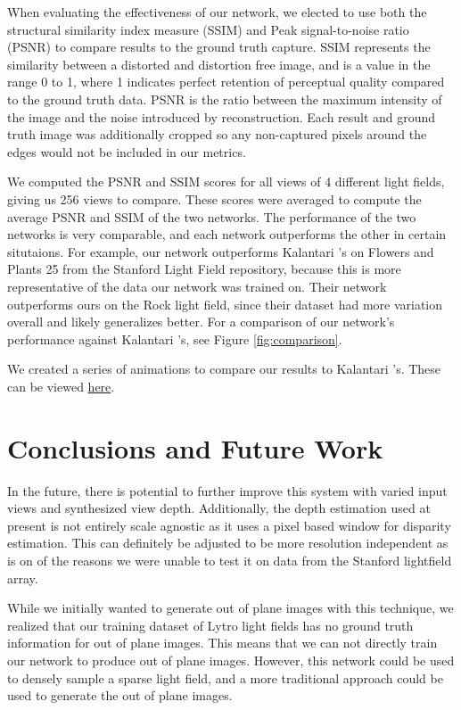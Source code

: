 \documentclass[10pt,twocolumn,letterpaper]{article}
\begin{document}
When evaluating the effectiveness of our network, we elected to use both the structural similarity index measure (SSIM)
and Peak signal-to-noise ratio (PSNR) to compare results to the ground truth capture. SSIM represents the similarity
between a distorted and distortion free image, and is a value in the range 0 to 1, where 1 indicates perfect retention
of perceptual quality compared to the ground truth data. PSNR is the ratio between the maximum intensity of the image
and the noise introduced by reconstruction. Each result and ground truth image was additionally cropped so any
non-captured pixels around the edges would not be included in our metrics.

We computed the PSNR and SSIM scores for all views of 4 different light fields, giving us 256 views to compare.
These scores were averaged to compute the average PSNR and SSIM of the two networks.
The performance of the two networks is very comparable, and each network outperforms the other in certain situtaions.
For example, our network outperforms Kalantari \etal's on Flowers and Plants 25 from the Stanford Light Field repository, 
because this is more representative of the data our network was trained on. Their network outperforms ours on 
the Rock light field, since their dataset had more variation overall and likely generalizes better.
For a comparison of our network's performance against Kalantari \etal's, see Figure \ref{fig:comparison}.


We created a series of animations to compare our results to Kalantari \etal's. These can be viewed 
\href{https://drive.google.com/drive/folders/1DDbB1v1vbq7zsg3srJPDKFlI9H7mGEmC?usp=sharing}{here}.

\section{Conclusions and Future Work}

In the future, there is potential to further improve this system with varied input views and synthesized
view depth. Additionally, the depth estimation used at present is not entirely scale agnostic as it
uses a pixel based window for disparity estimation. This can definitely be adjusted to be more resolution
independent as is on of the reasons we were unable to test it on data from the Stanford lightfield array.

While we initially wanted to generate out of plane images with this technique, we realized that our training dataset
of Lytro light fields has no ground truth information for out of plane images. This means that we can not directly
train our network to produce out of plane images. However, this network could be used to densely sample a sparse light field,
and a more traditional approach could be used to generate the out of plane images.


{\small


}
\end{document}
